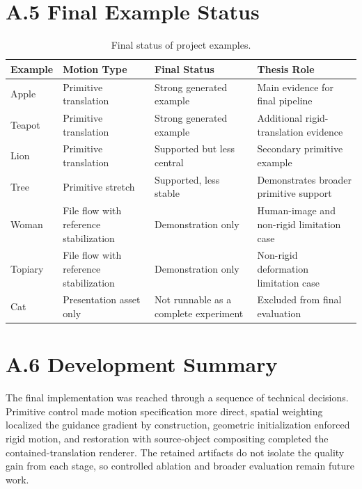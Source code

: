 \section*{A.5 Final Example Status}

\begin{table}[p]
  \centering
  \scriptsize
  \caption{Final status of project examples.}
  \label{tab:appendix-example-status}
  \renewcommand{\arraystretch}{1.12}
  \begin{tabular}{p{0.75in}|p{1.1in}|p{1.45in}|p{1.65in}}
    \hline
    \textbf{Example} & \textbf{Motion Type} & \textbf{Final Status} & \textbf{Thesis Role} \\ \hline \hline
    Apple & Primitive translation & Strong generated example & Main evidence for final pipeline \\ \hline
    Teapot & Primitive translation & Strong generated example & Additional rigid-translation evidence \\ \hline
    Lion & Primitive translation & Supported but less central & Secondary primitive example \\ \hline
    Tree & Primitive stretch & Supported, less stable & Demonstrates broader primitive support \\ \hline
    Woman & File flow with reference stabilization & Demonstration only & Human-image and non-rigid limitation case \\ \hline
    Topiary & File flow with reference stabilization & Demonstration only & Non-rigid deformation limitation case \\ \hline
    Cat & Presentation asset only & Not runnable as a complete experiment & Excluded from final evaluation \\ \hline
  \end{tabular}
\end{table}

\section*{A.6 Development Summary}

The final implementation was reached through a sequence of technical decisions. Primitive control made motion specification more direct, spatial weighting localized the guidance gradient by construction, geometric initialization enforced rigid motion, and restoration with source-object compositing completed the contained-translation renderer. The retained artifacts do not isolate the quality gain from each stage, so controlled ablation and broader evaluation remain future work.
